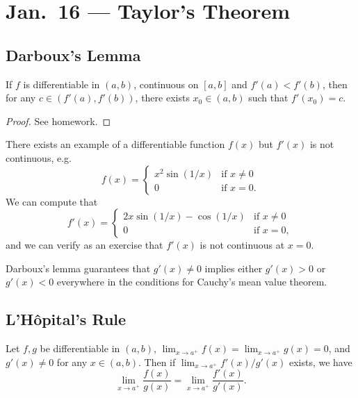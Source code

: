 \chapter{Jan.~16 --- Taylor's Theorem}

\section{Darboux's Lemma}
\begin{lemma}
  If $f$ is differentiable in $(a, b)$, continuous
  on $[a, b]$ and $f'(a) < f'(b)$, then for any
  $c \in (f'(a), f'(b))$, there exists $x_0 \in (a, b)$
  such that $f'(x_0) = c$.
\end{lemma}

\begin{proof}
  See homework.
\end{proof}

\begin{remark}
  There exists an example of a differentiable function
  $f(x)$ but $f'(x)$ is not continuous, e.g.
  \[
    f(x) =
    \begin{cases}
      x^2 \sin(1/x) & \text{if } x \ne 0 \\
      0 & \text{if } x = 0.
    \end{cases}
  \]
  We can compute that
  \[
    f'(x) =
    \begin{cases}
      2x \sin(1/x) - \cos(1/x) & \text{if } x \ne 0 \\
      0 & \text{if } x = 0,
    \end{cases}
  \]
  and we can verify as an exercise that $f'(x)$ is not
  continuous at $x = 0$.
\end{remark}

\begin{remark}
  Darboux's lemma guarantees that $g'(x) \ne 0$ implies
  either $g'(x) > 0$ or $g'(x) < 0$ everywhere in
  the conditions for Cauchy's mean value theorem.
\end{remark}

\section{L'H\^opital's Rule}
\begin{theorem}
  Let $f, g$ be differentiable in $(a, b)$,
  $\lim_{x \to a^+} f(x) = \lim_{x \to a^+} g(x) = 0$,
  and $g'(x) \ne 0$ for any $x \in (a, b)$. Then
  if $\lim_{x \to a^+} f'(x)/g'(x)$ exists, we have
  \[
    \lim_{x \to a^+} \frac{f(x)}{g(x)} = \lim_{x \to a^+} \frac{f'(x)}{g'(x)}.
  \]
\end{theorem}

